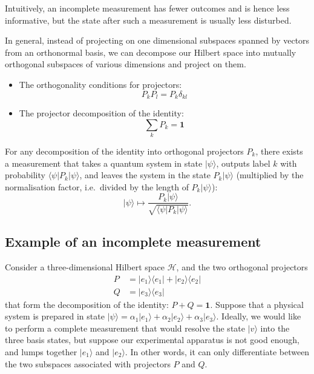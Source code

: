 \documentclass[fleqn]{article}
\providecommand{\tightlist}{%
  \setlength{\itemsep}{0pt}\setlength{\parskip}{0pt}}
\newenvironment{idea}{\noindent}{\medskip}
\begin{document}
\begin{idea}
Intuitively, an incomplete measurement has fewer outcomes and is hence less informative, but the state after such a measurement is usually less disturbed.

\end{idea}

In general, instead of projecting on one dimensional subspaces spanned by vectors from an orthonormal basis, we can decompose our Hilbert space into mutually orthogonal subspaces of various dimensions and project on them.

\begin{idea}

\begin{itemize}
\tightlist
\item
  The orthogonality conditions for projectors:
  \[
      P_k P_l = P_k\delta_{kl}
    \]
\item
  The projector decomposition of the identity:
  \[
      \sum_k P_k = \mathbf{1}
    \]
\end{itemize}


\end{idea}

For any decomposition of the identity into orthogonal projectors \(P_k\), there exists a measurement that takes a quantum system in state \(|\psi\rangle\), outputs label \(k\) with probability \(\langle\psi|P_k|\psi\rangle\), and leaves the system in the state \(P_k|\psi\rangle\) (multiplied by the normalisation factor, i.e.~divided by the length of \(P_k|\psi\rangle\)):
\[
  |\psi\rangle
  \mapsto
  \frac{P_k|\psi\rangle}{\sqrt{\langle\psi|P_k|\psi\rangle}}.
\]

\hypertarget{example-of-an-incomplete-measurement}{%
\subsection{Example of an incomplete measurement}\label{example-of-an-incomplete-measurement}}

Consider a three-dimensional Hilbert space \(\mathcal{H}\), and the two orthogonal projectors
\[
  \begin{aligned}
    P &= |e_1\rangle\langle e_1| + |e_2\rangle\langle e_2|
  \\Q &= |e_3\rangle\langle e_3|
  \end{aligned}
\]
that form the decomposition of the identity: \(P+Q=\mathbf{1}\).
Suppose that a physical system is prepared in state \(|\psi\rangle = \alpha_1|e_1\rangle + \alpha_2|e_2\rangle + \alpha_3|e_3\rangle\).
Ideally, we would like to perform a complete measurement that would resolve the state \(|v\rangle\) into the three basis states, but suppose our experimental apparatus is not good enough, and lumps together \(|e_1\rangle\) and \(|e_2\rangle\).
In other words, it can only differentiate between the two subspaces associated with projectors \(P\) and \(Q\).
\end{document}
